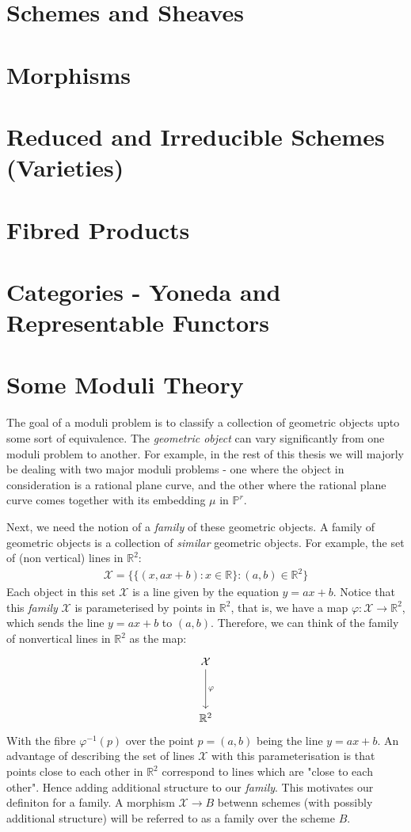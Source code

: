 \section{Schemes and Sheaves}
\section{Morphisms}
\section{Reduced and Irreducible Schemes (Varieties)}
\section{Fibred Products}
\section{Categories - Yoneda and Representable Functors}
\section{Some Moduli Theory}
The goal of a moduli problem is to classify a collection of geometric objects upto some sort of equivalence.
The \textit{geometric object} can vary significantly from one moduli problem to another. 
For example, in the rest of this thesis we will majorly be dealing with two major moduli problems - one where the object in consideration is a rational plane curve, and the other where the rational plane curve comes together with its embedding $\mu$ in $\mathbb{P}^{r}$.
\par Next, we need the notion of a \textit{family} of these geometric objects. A family of geometric objects is a collection of \textit{similar} geometric objects. For example, the set of (non vertical) lines in $\mathbb{R}^{2}$:
\begin{align*}
    \mathcal{X} = \{\{(x, ax + b): x \in \mathbb{R}\} : (a,b) \in \mathbb{R}^{2}\}
\end{align*}
Each object in this set $\mathcal{X}$ is a line given by the equation $y = ax + b$.
Notice that this \textit{family} $\mathcal{X}$ is parameterised by points in $\mathbb{R}^{2}$, that is, we have a map $\varphi: \mathcal{X} \to \mathbb{R}^{2}$, which sends the line $y = ax + b$ to $(a,b)$.  
Therefore, we can think of the family of nonvertical lines in $\mathbb{R}^{2}$ as the map:
\[\begin{tikzcd}
	{\mathcal{X}} \\
	\\
	{\mathbb{R}^2}
	\arrow["\varphi",from=1-1, to=3-1]
\end{tikzcd}\]
With the fibre $\varphi^{-1}(p)$ over the point $p = (a,b)$ being the line $y = ax + b$.
An advantage of describing the set of lines $\mathcal{X}$ with this parameterisation is that points close to each other in $\mathbb{R}^{2}$ correspond to lines which are "close to each other".  
Hence adding additional structure to our \textit{family}. 
This motivates our definiton for a family.
A morphism $\mathcal{X} \to B$ betwenn schemes (with possibly additional structure) will be referred to as a family over the scheme $B$.

